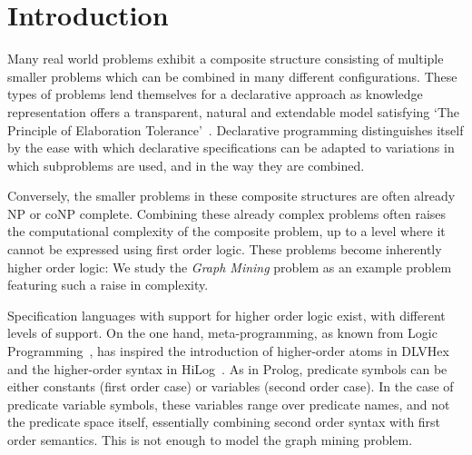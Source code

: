 \section{Introduction}
Many real world problems exhibit a composite structure consisting of multiple smaller problems which can be combined in many different configurations.
These types of problems lend themselves for a declarative approach as knowledge representation offers a transparent, natural and extendable model satisfying `The Principle of Elaboration Tolerance'~\citep{elaboration_tolerance}.
Declarative programming distinguishes itself by the ease with which declarative specifications can be adapted to variations in which subproblems are used, and in the way they are combined.

Conversely, the smaller problems in these composite structures are often already NP or coNP complete.
Combining these already complex problems often raises the computational complexity of the composite problem, up to a level where it cannot be expressed using first order logic.
These problems become inherently higher order logic: We study the \emph{Graph Mining} problem as an example problem featuring such a raise in complexity.

Specification languages with support for higher order logic exist, with different levels of support.
On the one hand, meta-programming, as known from Logic Programming~\citep{abramson1989meta}, has inspired the introduction of higher-order atoms in DLVHex~\citep{conf/ijcai/EiterIST05}  and the higher-order syntax in HiLog~\citep{chen1993hilog}.
As in Prolog, predicate symbols can be either constants (first order case) or variables (second order case).
In the case of predicate variable symbols, these variables range over predicate names, and not the predicate space itself, essentially combining second order syntax with first order semantics. 
This is not enough to model the graph mining problem.

